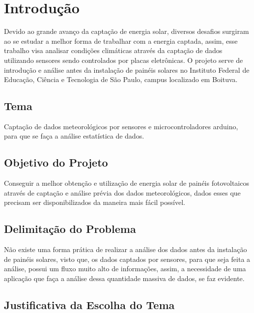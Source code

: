 \chapter{Introdução}

Devido ao grande avanço da captação de energia solar, diversos desafios surgiram ao se estudar a melhor forma de trabalhar com a energia captada, assim, esse trabalho visa analisar condições climáticas através da captação de dados utilizando sensores sendo controlados por placas eletrônicas.
O projeto serve de introdução e análise antes da instalação de painéis solares no Instituto Federal de Educação, Ciência e Tecnologia de São Paulo, campus localizado em Boituva.

\section{Tema}

Captação de dados meteorológicos por sensores e microcontroladores arduino, para que se faça a análise estatística de dados.

\section{Objetivo do Projeto}

Conseguir a melhor obtenção e utilização de energia solar de painéis fotovoltaicos através de captação e análise prévia dos dados meteorológicos, dados esses que precisam ser disponibilizados da maneira mais fácil possível.

\section{Delimitação do Problema}

Não existe uma forma prática de realizar a análise dos dados antes da instalação de painéis solares, visto que, os dados captados por sensores, para que seja feita a análise, possui um fluxo muito alto de informações, assim, a necessidade de uma aplicação que faça a análise dessa quantidade massiva de dados, se faz evidente.

\section{Justificativa da Escolha do Tema}

